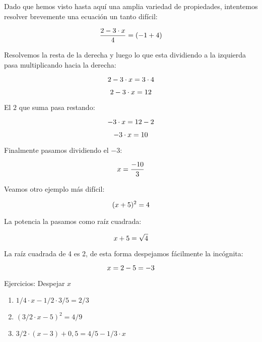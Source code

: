 Dado que hemos visto hasta aquí una amplia variedad de propiedades, intentemos resolver brevemente una ecuación un tanto difícil: 

\begin{equation}
    \notag
    \frac{2-3\cdot x}{4} = (-1+4)
\end{equation}

Resolvemos la resta de la derecha y luego lo que esta dividiendo a la izquierda pasa multiplicando hacia la derecha:

\begin{equation}
    \notag
    2-3\cdot x = 3\cdot 4 
\end{equation}

\begin{equation}
    \notag
    2-3\cdot x = 12
\end{equation}

El $2$ que suma pasa restando:

\begin{equation}
    \notag
    -3\cdot x = 12-2
\end{equation}

\begin{equation}
    \notag
    -3\cdot x = 10
\end{equation}

Finalmente pasamos dividiendo el $-3$:

\begin{equation}
    \notag
    x = \frac{-10}{3}
\end{equation}


Veamos otro ejemplo más difícil:

\begin{equation}
    \notag
    (x+5)^2=4
\end{equation}

La potencia la pasamos como raíz cuadrada:

\begin{equation}
    \notag
    x+5 = \sqrt{4} 
\end{equation}

La raíz cuadrada de 4 es 2, de esta forma despejamos fácilmente la incógnita:

\begin{equation}
    \notag
    x = 2-5 = -3 
\end{equation}

Ejercicios: Despejar $x$
\begin{enumerate}
\renewcommand{\labelenumi}{{\theenumi})}
\item $1/4 \cdot x -1/2\cdot 3/5 =2/3$
\item $(3/2 \cdot x -5)^2 = 4/9$
\item $3/2\cdot (x-3)+0,5 = 4/5 -1/3 \cdot x$
\end{enumerate}

